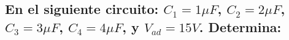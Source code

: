 \documentclass[10pt, twoside]{article}
\begin{document}
\subsection*{En el siguiente circuito: $C_1 = 1\mu F$,
	$C_2 = 2\mu F$,
	$C_3 = 3\mu F$,
	$C_4 = 4\mu F$,
	y $V_{ad}=15V$. Determina:}%
\end{document}
